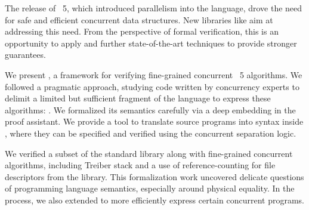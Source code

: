 The release of \OCaml~5, which introduced parallelism into the language, drove the need for safe and efficient concurrent data structures.
New libraries like \Saturn aim at addressing this need.
From the perspective of formal verification, this is an opportunity to apply and further state-of-the-art techniques to provide stronger guarantees.

We present \Zoo, a framework for verifying fine-grained concurrent \OCaml~5 algorithms.
We followed a pragmatic approach, studying \OCaml code written by concurrency experts to delimit a limited but sufficient fragment of the language to express these algorithms: \ZooLang.
We formalized its semantics carefully via a deep embedding in the \Rocq proof assistant.
We provide a tool to translate source \OCaml programs into \ZooLang syntax inside \Rocq, where they can be specified and verified using the \Iris concurrent separation logic.

We verified a subset of the standard library along with fine-grained concurrent algorithms, including Treiber stack and a use of reference-counting for file descriptors from the \Eio library.
This formalization work uncovered delicate questions of programming language semantics, especially around physical equality.
In the process, we also extended \OCaml to more efficiently express certain concurrent programs.
